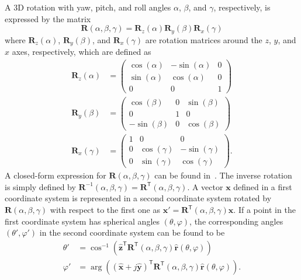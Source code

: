 A 3D rotation with yaw, pitch, and roll angles $\alpha$, $\beta$, and $\gamma$, respectively, is expressed by the matrix
\begin{equation}
    \label{eq:rotation}
    \mathbf{R}(\alpha, \beta, \gamma) = \mathbf{R}_z(\alpha)\mathbf{R}_y(\beta)\mathbf{R}_x(\gamma)
\end{equation}
where $\mathbf{R}_z(\alpha)$, $\mathbf{R}_y(\beta)$, and $\mathbf{R}_x(\gamma)$ are rotation matrices around the $z$, $y$, and $x$ axes, respectively, which are defined as
\begin{equation}
    \begin{aligned}
        \mathbf{R}_z(\alpha) &= \begin{pmatrix}
                        \cos(\alpha) & -\sin(\alpha) & 0\\
                        \sin(\alpha) & \cos(\alpha) & 0\\
                        0 & 0 & 1
                      \end{pmatrix}\\
        \mathbf{R}_y(\beta) &= \begin{pmatrix}
                        \cos(\beta) & 0 & \sin(\beta)\\
                        0 & 1 & 0\\
                        -\sin(\beta) & 0 & \cos(\beta)
                      \end{pmatrix}\\
        \mathbf{R}_x(\gamma) &= \begin{pmatrix}
                            1 & 0 & 0\\
                            0 & \cos(\gamma) & -\sin(\gamma)\\
                            0 & \sin(\gamma) & \cos(\gamma)
                      \end{pmatrix}.
    \end{aligned}
\end{equation}
%
A closed-form expression for $\mathbf{R}(\alpha, \beta, \gamma)$ can be found in~\cite[Sec.~7.1-4]{TR38901}.
The inverse rotation is simply defined by $\mathbf{R}^{-1}(\alpha, \beta, \gamma)=\mathbf{R}^\mathsf{T}(\alpha, \beta, \gamma)$.
A vector $\mathbf{x}$ defined in a first coordinate system is represented in a second coordinate system rotated by $\mathbf{R}(\alpha, \beta, \gamma)$ with respect to the first one as $\mathbf{x}'=\mathbf{R}^\mathsf{T}(\alpha, \beta, \gamma)\mathbf{x}$.
If a point in the first coordinate system has spherical angles $(\theta, \varphi)$, the corresponding angles $(\theta', \varphi')$ in the second coordinate system can be found to be
\begin{equation}
    \label{eq:theta_phi_prime}
    \begin{aligned}
        \theta' &= \cos^{-1}\left( \hat{\mathbf{z}}^\mathsf{T} \mathbf{R}^\mathsf{T}(\alpha, \beta, \gamma)\hat{\mathbf{r}}(\theta, \varphi)          \right)\\
        \varphi' &= \arg\left( \left( \hat{\mathbf{x}} + j\hat{\mathbf{y}}\right)^\mathsf{T} \mathbf{R}^\mathsf{T}(\alpha, \beta, \gamma)\hat{\mathbf{r}}(\theta, \varphi) \right).
    \end{aligned}
\end{equation}

